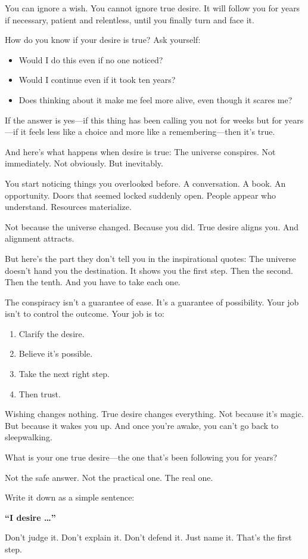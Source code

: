 \documentclass[11pt, a5paper, openright]{book}
\begin{document}
You can ignore a wish. You cannot ignore true desire. It will follow you for years if necessary, patient and relentless, until you finally turn and face it.

How do you know if your desire is true? Ask yourself:

\begin{itemize}
\item Would I do this even if no one noticed?
\item Would I continue even if it took ten years?
\item Does thinking about it make me feel more alive, even though it scares me?
\end{itemize}

If the answer is yes—if this thing has been calling you not for weeks but for years—if it feels less like a choice and more like a remembering—then it's true.

And here's what happens when desire is true: The universe conspires. Not immediately. Not obviously. But inevitably.

You start noticing things you overlooked before. A conversation. A book. An opportunity. Doors that seemed locked suddenly open. People appear who understand. Resources materialize.

Not because the universe changed. Because you did. True desire aligns you. And alignment attracts.

But here's the part they don't tell you in the inspirational quotes: The universe doesn't hand you the destination. It shows you the first step. Then the second. Then the tenth. And you have to take each one.

The conspiracy isn't a guarantee of ease. It's a guarantee of possibility. Your job isn't to control the outcome. Your job is to:

\begin{enumerate}
\item Clarify the desire.
\item Believe it's possible.
\item Take the next right step.
\item Then trust.
\end{enumerate}

Wishing changes nothing. True desire changes everything. Not because it's magic. But because it wakes you up. And once you're awake, you can't go back to sleepwalking.

\begin{reflectionbox}
What is your one true desire—the one that's been following you for years?

Not the safe answer. Not the practical one. The real one.

Write it down as a simple sentence:

\textbf{``I desire \dots''}

Don't judge it. Don't explain it. Don't defend it. Just name it. That's the first step.
\end{reflectionbox}
\end{document}

